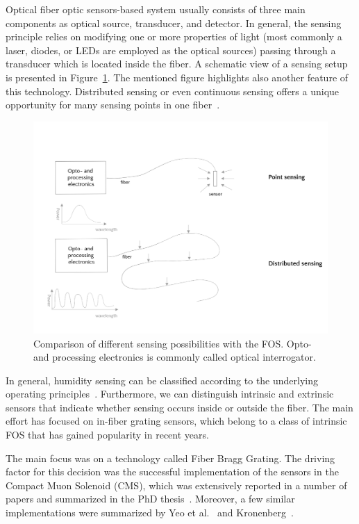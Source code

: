 Optical fiber optic sensors-based system usually consists of three main components as optical source, transducer, and detector. In general, the sensing principle relies on modifying one or more properties of light (most commonly a laser, diodes, or LEDs are employed as the optical sources) passing through a transducer which is located inside the fiber. A schematic view of a sensing setup is presented in Figure~\ref{fig:sensing}. The mentioned figure highlights also another feature of this technology. Distributed sensing or even continuous sensing offers a unique opportunity for many sensing points in one fiber~\cite{GRATTAN200040}. 
\newpage
\begin{figure}[!h]
\centering
\includegraphics[width=0.95\columnwidth]{Chapter5/images/sensing.png}
\caption{Comparison of different sensing possibilities with the \gls{FOS}. Opto- and processing electronics is commonly called optical interrogator.}
\label{fig:sensing}
\end{figure}

In general, humidity sensing can be classified according to the underlying operating principles~\cite{fos_overview}. Furthermore, we can distinguish intrinsic and extrinsic sensors that indicate whether sensing occurs inside or outside the fiber. The main effort has focused on in-fiber grating sensors, which belong to a class of intrinsic \gls{FOS} that has gained popularity in recent years. 

The main focus was on a technology called Fiber Bragg Grating. The driving factor for this decision was the successful implementation of the sensors in the Compact Muon Solenoid (\gls{CMS}), which was extensively reported in a number of papers and summarized in the PhD thesis~\cite{Berruti}. Moreover, a few similar implementations were summarized by Yeo et al.~\cite{YEO_PI} and Kronenberg~\cite{Kronenberg:02}. 

